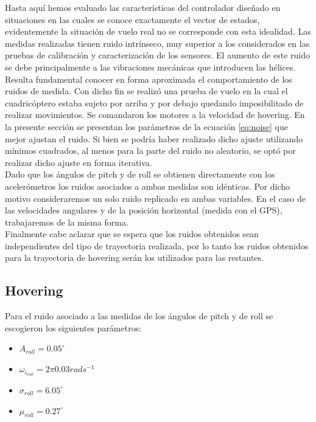 \documentclass[main]{subfiles}
\begin{document}
Hasta aqu\'i hemos evaluado las caracter\'isticas del controlador diseñado en situaciones en las cuales se conoce exactamente el vector de estados, evidentemente la situaci\'on de vuelo real no se corresponde con esta idealidad. Las medidas realizadas tienen ruido intr\'inseco, muy superior a los considerados en las pruebas de calibraci\'on y caracterizaci\'on de los sensores. El aumento de este ruido se debe principalmente a las vibraciones mec\'anicas que introducen las h\'elices.\\

Resulta fundamental conocer en forma aproximada el comportamiento de los ruidos de medida. Con dicho fin se realiz\'o una prueba de vuelo en la cual el cuadric\'optero estaba sujeto por arriba y por debajo quedando imposibilitado de realizar movimientos. Se comandaron los motores a la velocidad de hovering. En la presente secci\'on se presentan los par\'ametros de la ecuaci\'on \ref{eq:noise} que mejor ajustan el ruido. Si bien se podr\'ia haber realizado dicho ajuste utilizando m\'inimos cuadrados, al menos para la parte del ruido no aleatorio, se opt\'o por realizar dicho ajuste en forma iterativa.\\

Dado que los \'angulos de pitch y de roll se obtienen directamente con los aceler\'ometros los ruidos asociados a ambas medidas son id\'enticas. Por dicho motivo consideraremos un solo ruido replicado en ambas variables. En el caso de las velocidades angulares y de la posici\'on horizontal (medida con el GPS), trabajaremos de la misma forma.\\ 

Finalmente cabe aclarar que se espera que los ruidos obtenidos sean independientes del tipo de trayectoria realizada, por lo tanto los ruidos obtenidos para la trayectoria de hovering ser\'an los utilizados para las restantes. 
\subsection{Hovering}

Para el ruido asociado a las medidas de los \'angulos de pitch y de roll se escogieron los siguientes par\'ametros:

\begin{itemize}
\item $A_{roll} = 0.05^\circ$
\item $\omega_{i_{roll}} = 2\pi 0.03 rads^{-1}$
\item $\sigma_{roll} = 6.05^\circ$
\item $\mu_{roll} = 0.27 ^\circ$
\end{itemize}
  
\end{document}

